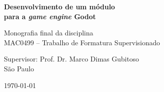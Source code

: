 \newpage
\thispagestyle{empty}
  \begin{center}
    \vspace*{2.3 cm}
    \textbf{\Large{Desenvolvimento de um módulo \\[0.5\baselineskip]
    para a \textit{game engine} Godot}}
    \vspace*{2 cm}
  \end{center}

  \vskip 2cm

  \begin{flushright}
    Monografia final da disciplina \\
    MAC0499 -- Trabalho de Formatura Supervisionado
  \end{flushright}

  \vskip 5cm

  \begin{center}
  Supervisor: Prof. Dr. Marco Dimas Gubitoso \\

  \vskip 5cm
  \normalsize{São Paulo}

  \today
  \end{center}
\pagebreak
